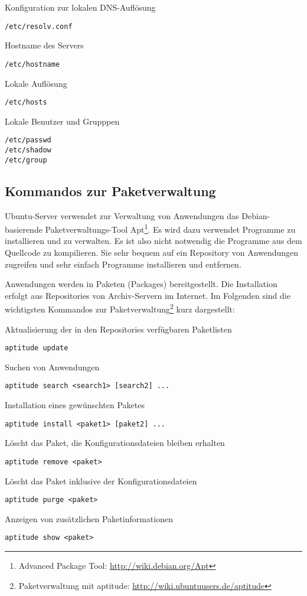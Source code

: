 Konfiguration zur lokalen DNS-Auflösung
\begin{lstlisting}
/etc/resolv.conf
\end{lstlisting}

Hostname des Servers
\begin{lstlisting}
/etc/hostname
\end{lstlisting}

Lokale Auflösung
\begin{lstlisting}
/etc/hosts
\end{lstlisting}

Lokale Benutzer und Grupppen
\begin{lstlisting}
/etc/passwd
/etc/shadow
/etc/group
\end{lstlisting}


\subsection{Kommandos zur Paketverwaltung}
Ubuntu-Server verwendet zur Verwaltung von Anwendungen das Debian-basierende
Paketverwaltungs-Tool Apt\footnote{Advanced Package Tool:
\url{http://wiki.debian.org/Apt}}. Es wird dazu verwendet Programme zu
installieren und zu verwalten. Es ist also nicht notwendig die Programme aus dem
Quellcode zu kompilieren. Sie sehr bequem auf ein Repository von Anwendungen
zugreifen und sehr einfach Programme installieren und entfernen. 

Anwendungen werden in Paketen (Packages) bereitgestellt. Die Installation
erfolgt aus Repositories von Archiv-Servern im Internet. Im Folgenden sind die wichtigsten
Kommandos zur Paketverwaltung\footnote{Paketverwaltung mit aptitude:
\url{http://wiki.ubuntuusers.de/aptitude}} kurz dargestellt:

Aktualisierung der in den Repositories verfügbaren Paketlisten
\begin{lstlisting}
aptitude update
\end{lstlisting}

Suchen von Anwendungen
\begin{lstlisting}
aptitude search <search1> [search2] ...
\end{lstlisting}

Installation eines gewünschten Paketes
\begin{lstlisting}
aptitude install <paket1> [paket2] ...
\end{lstlisting}

Löscht das Paket, die Konfigurationsdateien bleiben erhalten
\begin{lstlisting}
aptitude remove <paket>
\end{lstlisting}

Löscht das Paket inklusive der Konfigurationsdateien
\begin{lstlisting}
aptitude purge <paket>
\end{lstlisting}

Anzeigen von zusätzlichen Paketinformationen
\begin{lstlisting}
aptitude show <paket>
\end{lstlisting}

